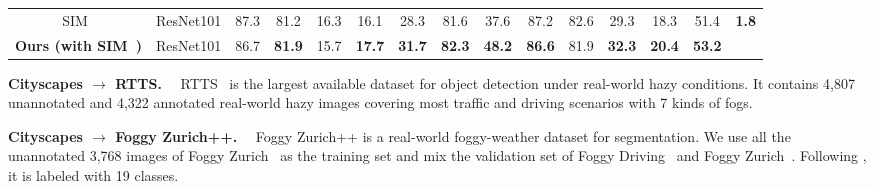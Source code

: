 \documentclass[10pt,journal,compsoc]{IEEEtran}
\renewcommand{\paragraph}[1]{\noindent\textbf{#1}~~}
\begin{document}
\begin{table*}{}
{\begin{tabular}{c|c|ccccccccccc|c|c}
\midrule
SIM~\cite{SIM} & ResNet101 &87.3	&81.2	&16.3	&16.1	&28.3	&81.6	&37.6	&87.2	&82.6	&29.3	&18.3	&51.4 &\multirow{2}{*}{\textbf{1.8}} \\
\textbf{Ours (with SIM~\cite{SIM})} & ResNet101 &86.7 	&\textbf{81.9}	 &15.7	 &\textbf{17.7}	 &\textbf{31.7}	 &\textbf{82.3}	 &\textbf{48.2}	 &\textbf{86.6}	 &81.9	 &\textbf{32.3}	 &\textbf{20.4}	 &\textbf{53.2} &
\\
\bottomrule
\end{tabular}
}
\end{table*}


\begin{table}{}
\caption{Synthetic-to-real adaptation of object detection from SIM10K to Cityscapes (default dimension is style). 
}
\label{table:sim10k_det}
\centering
{}
\end{table}


\paragraph{Cityscapes $\rightarrow$ RTTS.} RTTS~\cite{RTTS}
is the largest available dataset for object detection under real-world hazy conditions. It contains 4,807 unannotated and 4,322 annotated real-world hazy images covering 
most traffic and driving scenarios with 7 kinds of fogs. 


\paragraph{Cityscapes $\rightarrow$ Foggy Zurich++.} Foggy Zurich++ is a real-world foggy-weather dataset  for segmentation. We use all the unannotated 3,768 images of Foggy Zurich~\cite{FoggyCity} as the training set and mix the validation set of Foggy Driving~\cite{FoggyDriving} and Foggy Zurich~\cite{FoggyCity}. Following \cite{cordts2016cityscapes}, it is labeled with 19 classes. 
\end{document}
